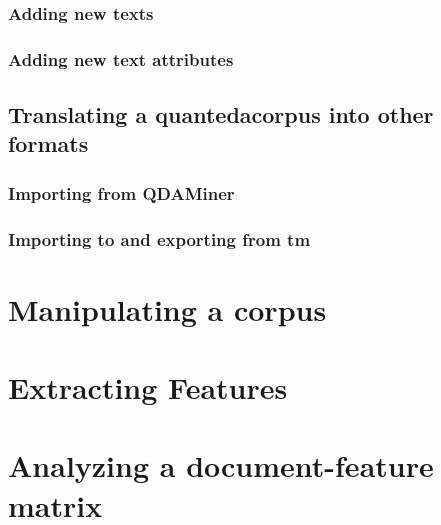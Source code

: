\documentclass[11pt]{article}\usepackage[]{graphicx}\usepackage[]{color}
\newcommand{\quanteda}{\textsf{quanteda}}
\begin{document}
\subsubsection{Adding new texts}

\subsubsection{Adding new text attributes}


\subsection{Translating a \quanteda corpus into other formats}

\subsubsection{Importing from QDAMiner}

\subsubsection{Importing to and exporting from \textsf{tm}}


\section{Manipulating a corpus}


\section{Extracting Features}


\section{Analyzing a document-feature matrix}


\end{document}

